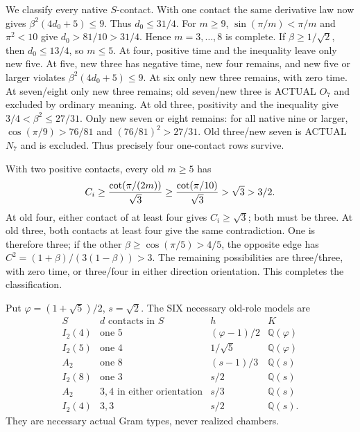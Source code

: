 \documentclass[11pt]{article}
\begin{document}
We classify every native \(S\)-contact.
With one contact the same derivative law
now gives \(\beta^2(4d_0+5)\le9\).
Thus \(d_0\le31/4\).
For \(m\ge9\), \(\sin(\pi/m)<\pi/m\) and
\(\pi^2<10\) give \(d_0>81/10>31/4\).
Hence \(m=3,\ldots,8\) is complete.
If \(\beta\ge1/\sqrt2\), then
\(d_0\le13/4\), so \(m\le5\).
At four, positive time and the inequality
leave only new five.
At five, new three has negative time,
new four remains, and new five or larger
violates \(\beta^2(4d_0+5)\le9\).
At six only new three remains, with
zero time.
At seven/eight only new three remains;
old seven/new three is ACTUAL \(O_7\)
and excluded by ordinary meaning.
At old three, positivity and the inequality
give \(3/4<\beta^2\le27/31\).
Only new seven or eight remains:
for all native nine or larger,
\(\cos(\pi/9)>76/81\) and
\((76/81)^2>27/31\).
Old three/new seven is ACTUAL \(N_7\)
and is excluded.
Thus precisely four one-contact rows survive.

With two positive contacts, every old
\(m\ge5\) has
\[
                   C_i\ge{\cot(\pi/(2m))\over\sqrt3}
                       \ge{\cot(\pi/10)\over\sqrt3}
                       >\sqrt3>3/2 .
\]
At old four, either contact of at least
four gives \(C_i\ge\sqrt3\);
both must be three.
At old three, both contacts at least four
give the same contradiction.
One is therefore three; if the other
\(\beta\ge\cos(\pi/5)>4/5\), the opposite
edge has \(C^2=(1+\beta)/(3(1-\beta))>3\).
The remaining possibilities are three/three,
with zero time, or three/four in either
direction orientation.
This completes the classification.

Put \(\varphi=(1+\sqrt5)/2\), \(s=\sqrt2\).
The SIX necessary old-role models are
\[
 \begin{array}{c|c|c|c}
 S&d\text{ contacts in }S&h&K\\ \hline
 I_2(4)&\text{one }5&(\varphi-1)/2&\mathbb Q(\varphi)\\
 I_2(5)&\text{one }4&1/\sqrt5&\mathbb Q(\varphi)\\
 A_2&\text{one }8&(s-1)/3&\mathbb Q(s)\\
 I_2(8)&\text{one }3&s/2&\mathbb Q(s)\\
 A_2&3,4\text{ in either orientation}&s/3&\mathbb Q(s)\\
 I_2(4)&3,3&s/2&\mathbb Q(s).
 \end{array}
\tag{A14six}\label{eq:arithA14sixmodels}
\]
They are necessary actual Gram types,
never realized chambers.
\end{document}
